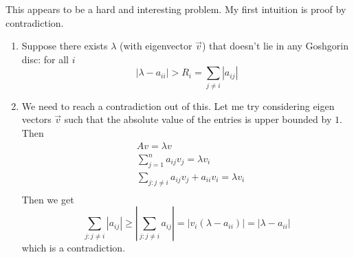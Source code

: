 \documentclass[../main]{subfiles}
\begin{document}
    \begin{solution}
        This appears to be a hard and interesting problem. My first intuition is proof by contradiction.
        \begin{enumerate}
            \item Suppose there exists $\lambda$ (with eigenvector $\vec v$) that doesn't lie in any Goshgorin disc: for all $i$
            \[
            |\lambda - a_{ii}| > R_i = \sum_{j\ne i} |a_{ij}|
            \]
            \item We need to reach a contradiction out of this. Let me try considering eigen vectors $\vec v$ such that the absolute value of the entries is upper bounded by $1$. Then 
            \begin{align*}
                &A v = \lambda v \\
                &\sum_{j=1}^n a_{ij}v_j=\lambda v_i\\
                &\sum_{j:j\ne i}a_{ij}v_j + a_{ii}v_i  = \lambda v_i\\
            \end{align*}
            Then we get 
            \[
            \sum_{j:j\neq i}|a_{ij}| \ge |\sum_{j:j\ne i}a_{ij}| = |v_i(\lambda-a_{ii})| = |\lambda-a_{ii}|
            \]
            which is a contradiction.
        \end{enumerate}
    \end{solution}
    
\end{document}
